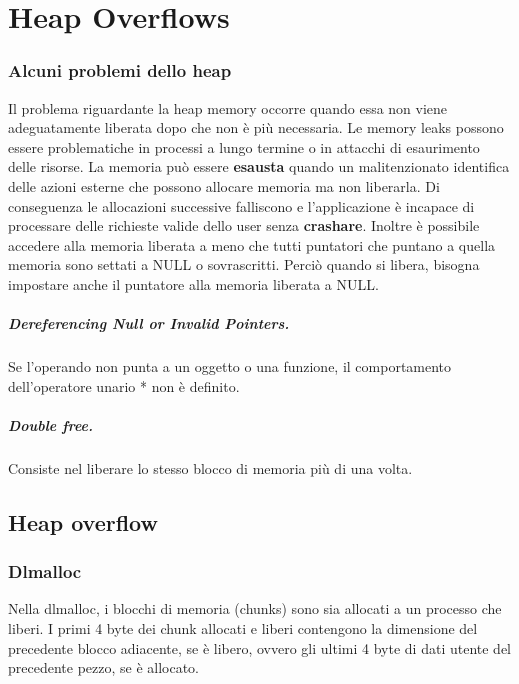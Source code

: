 \chapter{Heap Overflows}
\subsection{Alcuni problemi dello heap}
Il problema riguardante la heap memory occorre quando essa non viene adeguatamente liberata 
dopo che non è più necessaria. Le memory leaks possono essere problematiche in processi a lungo termine
 o in attacchi di esaurimento delle risorse. La memoria può essere \textbf{esausta} quando un malitenzionato identifica delle azioni esterne che possono allocare memoria ma non liberarla. Di conseguenza le allocazioni successive  falliscono e l'applicazione è incapace di processare delle richieste valide dello user senza \textbf{crashare}. Inoltre è possibile accedere alla memoria liberata a meno che tutti puntatori che puntano a quella memoria sono settati a NULL o sovrascritti. Perciò quando si libera, bisogna impostare anche il puntatore alla memoria liberata a NULL.
 
 \paragraph{Dereferencing Null or Invalid Pointers.} Se l'operando non punta a un oggetto o una funzione, il comportamento dell'operatore unario * non è definito.
 
 \paragraph{Double free.} Consiste nel liberare lo stesso blocco di memoria più di una volta.
 
 \section{Heap overflow}
 \subsection{Dlmalloc}
 Nella dlmalloc, i blocchi di memoria (chunks) sono sia allocati a un processo che liberi. I primi 4 byte dei chunk allocati e liberi contengono la dimensione del precedente blocco adiacente, se è libero, ovvero gli ultimi 4 byte di dati utente del precedente pezzo, se è allocato. 
 
